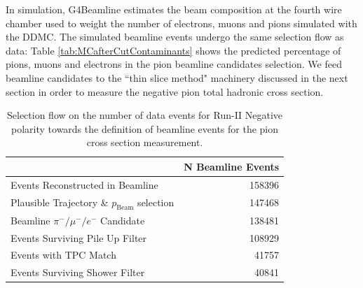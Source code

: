 \documentclass[aps,prl,twocolumn,showpacs,superscriptaddress,groupedaddress]{revtex4}  %
\begin{document}
In simulation, G4Beamline estimates the beam composition at the fourth wire chamber used to weight the number of electrons, muons and pions simulated with the DDMC. The simulated beamline events undergo the same selection flow as data: Table \ref{tab:MCafterCutContaminants} shows the predicted percentage of pions, muons and electrons in the pion beamline candidates selection. We feed beamline candidates to the ``thin slice method" machinery discussed in the next section in order to measure the negative pion total hadronic cross section. 



\begin{table}
\caption{\label{tab:beamlineDataSelection}Selection flow on the number of data events for Run-II Negative polarity towards the definition of beamline events for the pion cross section measurement.}
\begin{ruledtabular}
\begin{tabular}{l|r}
                                                        &  N Beamline Events     \\ \hline
Events Reconstructed in Beamline        &  158396     \\ \hline
Plausible Trajectory \& $p_{\text{Beam}}$ selection       &   147468    \\ \hline
Beamline $\pi^-/\mu^-/e^-$  Candidate  &   138481    \\ \hline
Events Surviving Pile Up Filter              &   108929    \\ \hline
Events with TPC Match                         &    41757     \\ \hline
Events Surviving Shower Filter             &    40841     \\ 
\end{tabular}
\end{ruledtabular}
\end{table}
\end{document}
